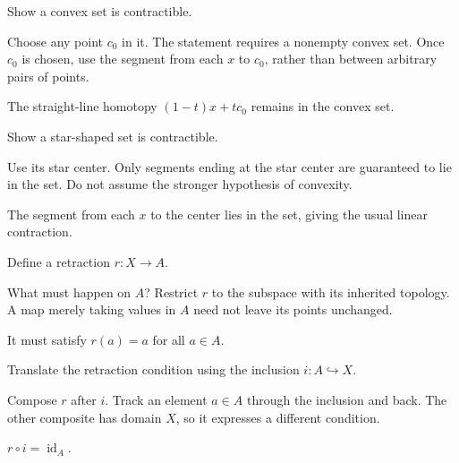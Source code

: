 \begin{exercise}\label{exr:viii02-06}
Show a convex set is contractible.
\end{exercise}
\begin{hint}Choose any point \(c_0\) in it.
The statement requires a nonempty convex set. Once \(c_0\) is chosen, use the segment from each \(x\) to \(c_0\), rather than between arbitrary pairs of points.
\end{hint}
\begin{solution}
The straight-line homotopy \((1-t)x+tc_0\) remains in the convex set.
\end{solution}

\begin{exercise}\label{exr:viii02-07}
Show a star-shaped set is contractible.
\end{exercise}
\begin{hint}Use its star center.
Only segments ending at the star center are guaranteed to lie in the set. Do not assume the stronger hypothesis of convexity.
\end{hint}
\begin{solution}
The segment from each \(x\) to the center lies in the set, giving the usual
linear contraction.
\end{solution}

\begin{exercise}\label{exr:viii02-08}
Define a retraction \(r:X\to A\).
\end{exercise}
\begin{hint}What must happen on \(A\)?
Restrict \(r\) to the subspace with its inherited topology. A map merely taking values in \(A\) need not leave its points unchanged.
\end{hint}
\begin{solution}
It must satisfy \(r(a)=a\) for all \(a\in A\).
\end{solution}

\begin{exercise}\label{exr:viii02-09}
Translate the retraction condition using the inclusion \(i:A\hookrightarrow X\).
\end{exercise}
\begin{hint}Compose \(r\) after \(i\).
Track an element \(a\in A\) through the inclusion and back. The other composite has domain \(X\), so it expresses a different condition.
\end{hint}
\begin{solution}
\(r\circ i=\operatorname{id}_A\).
\end{solution}

